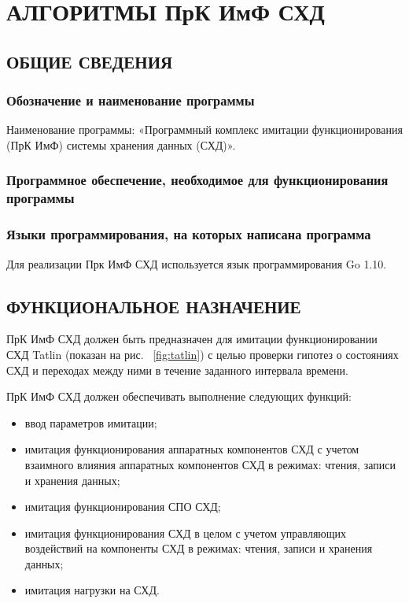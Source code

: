 \section{АЛГОРИТМЫ ПрК ИмФ СХД}

\subsection{ОБЩИЕ СВЕДЕНИЯ}

\subsubsection{Обозначение и наименование программы}
Наименование программы: «Программный комплекс имитации функционирования (ПрК ИмФ) системы хранения данных (СХД)».
\subsubsection{Программное обеспечение, необходимое для функционирования программы}

\subsubsection{Языки программирования, на которых написана программа}
Для реализации Прк ИмФ СХД используется язык программирования Go 1.10.  
\subsection{ФУНКЦИОНАЛЬНОЕ НАЗНАЧЕНИЕ}
ПрК ИмФ СХД должен быть предназначен для имитации функционировании СХД Tatlin (показан на рис. ~\ref{fig:tatlin}) с целью проверки гипотез о состояниях СХД и переходах между ними в течение заданного интервала времени. 

\par 
ПрК ИмФ СХД должен обеспечивать выполнение следующих функций:
\begin{itemize}
	\item ввод параметров имитации;
	\item имитация функционирования аппаратных компонентов СХД с учетом взаимного влияния аппаратных компонентов СХД в режимах: чтения, записи и хранения данных;
	\item имитация функционирования СПО СХД;
	\item имитация функционирования СХД в целом с учетом управляющих воздействий на компоненты СХД в режимах: чтения, записи и хранения данных;
	\item имитация нагрузки на СХД.
\end{itemize}


